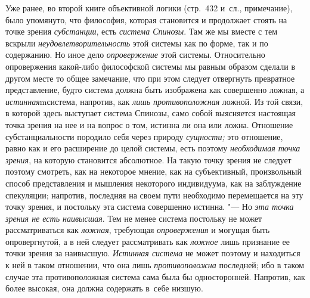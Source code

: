 Уже ранее, во второй книге объективной логики (стр.~432 и~сл., примечание),
было упомянуто, что философия, которая становится и продолжает стоять на
точке зрения {\em субстанции}, есть {\em система Спинозы}. Там же мы вместе
с тем вскрыли {\em неудовлетворительность} этой системы как по форме, так и
по содержанию. Но иное дело {\em опровержение} этой системы. Относительно
опровержения какой-либо философской системы мы равным образом сделали в
другом месте то общее замечание, что при этом следует отвергнуть превратное
представление, будто система должна быть изображена как совершенно ложная,
а {\em истинная}mсистема, напротив, как {\em лишь противоположная} ложной.
Из той связи, в которой здесь выступает система Спинозы, само собой
выясняется настоящая точка зрения на нее и на вопрос о том, истинна ли она
или ложна. Отношение субстанциальности породило себя через природу
{\em сущности;} это отношение, равно как и его расширение до целой системы,
есть поэтому {\em необходимая точка зрения}, на которую становится
абсолютное. На такую точку зрения не следует поэтому смотреть, как на
некоторое мнение, как на субъективный, произвольный способ представления и
мышления некоторого индивидуума, как на заблуждение спекуляции; напротив,
последняя на своем пути необходимо перемещается на эту точку зрения, и
постольку эта система совершенно истинна. "--- Но {\em эта точка зрения не есть
наивысшая}. Тем не менее система постольку не может рассматриваться как
{\em ложная}, требующая {\em опровержения} и могущая быть опровергнутой, а в
ней следует рассматривать как {\em ложное} лишь признание ее точки зрения за
наивысшую. {\em Истинная система} не может поэтому и находиться к ней в
таком отношении, что она лишь {\em противоположна} последней; ибо в таком
случае эта противоположная система сама была бы односторонней. Напротив, как
более высокая, она должна содержать в~себе низшую.

